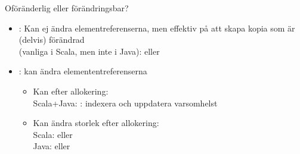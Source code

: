 



\begin{Slide}{Oföränderlig eller förändringsbar?}
\begin{itemize}
\item {}:  Kan ej ändra elementreferenserna, men effektiv på att skapa kopia som är (delvis) förändrad\\(vanliga i Scala, men inte i Java):  eller 

\item {}: kan ändra elemententreferenserna
  \begin{itemize} 
  \item Kan  efter allokering: \\ Scala+Java: : indexera och uppdatera varsomhelst
  \item Kan ändra storlek efter allokering: 
  \\ Scala:  eller 
  \\ Java:  eller 
  \end{itemize}
\end{itemize}
\end{Slide}




